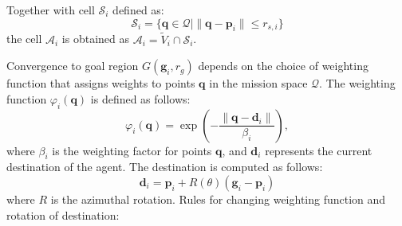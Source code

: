         Together with cell $\mathcal{S}_i$ defined as: 
        \begin{equation}
            \mathcal{S}_i = \{\mathbf{q} \in \mathcal{Q} | \| \mathbf{q} - \mathbf{p}_i \| \leq r_{s,i}\}
        \end{equation}
        the cell $\mathcal{A}_i$ is obtained as $\mathcal{A}_i = \tilde{V}_i \cap \mathcal{S}_i$.

        Convergence to goal region $G(\mathbf{g}_i, r_g )$ depends on the choice of weighting function that assigns weights to points $\mathbf{q}$ in the mission space $\mathcal{Q}$.
        The weighting function $\varphi_i(\mathbf{q})$ is defined as follows: 
        \begin{equation}
            \varphi_i(\mathbf{q}) = \exp\left(-\frac{\|\mathbf{q} - \mathbf{d}_i\|}{\beta_i}\right),
        \end{equation}
        where $\beta_i$ is the weighting factor for points $\mathbf{q}$, and $\mathbf{d}_i$ represents the current destination of the agent. 
        The destination is computed as follows:
        \begin{equation}
            \mathbf{d}_i = \mathbf{p}_i + R(\theta)(\mathbf{g}_i - \mathbf{p}_i)
        \end{equation}
        where $R$ is the azimuthal rotation.
        Rules for changing weighting function and rotation of destination: 
